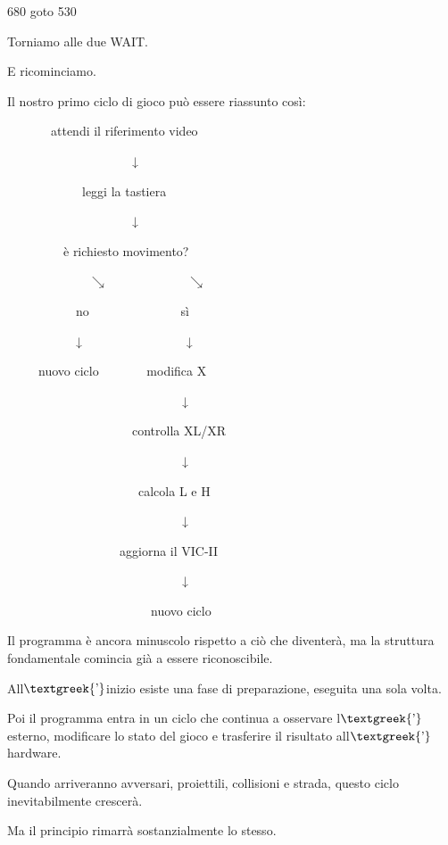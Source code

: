 \documentclass{article}
\begin{document}
680 goto 530

Torniamo alle due WAIT.

E ricominciamo.

Il nostro primo ciclo di gioco può essere riassunto così:

\ \ \ \ \ \ \ attendi il riferimento video

\ \ \ \ \ \ \ \ \ \ \ \ \ \ \ \ \ \ \ \ ↓

\ \ \ \ \ \ \ \ \ \ \ \ leggi la tastiera

\ \ \ \ \ \ \ \ \ \ \ \ \ \ \ \ \ \ \ \ ↓

\ \ \ \ \ \ \ \ \ è richiesto movimento?

\ \ \ \ \ \ \ \ \ \ \ \ \ $\searrow $ \ \ \ \ \ \ \ \ \ \ \ \ $\searrow $

\ \ \ \ \ \ \ \ \ \ \ no \ \ \ \ \ \ \ \ \ \ \ \ \ \ sì

\ \ \ \ \ \ \ \ \ \ \ ↓ \ \ \ \ \ \ \ \ \ \ \ \ \ \ \ \ ↓

\ \ \ \ \ nuovo ciclo \ \ \ \ \ \ \ modifica X

\ \ \ \ \ \ \ \ \ \ \ \ \ \ \ \ \ \ \ \ \ \ \ \ \ \ \ \ ↓

\ \ \ \ \ \ \ \ \ \ \ \ \ \ \ \ \ \ \ \ controlla XL/XR

\ \ \ \ \ \ \ \ \ \ \ \ \ \ \ \ \ \ \ \ \ \ \ \ \ \ \ \ ↓

\ \ \ \ \ \ \ \ \ \ \ \ \ \ \ \ \ \ \ \ \ calcola L e H

\ \ \ \ \ \ \ \ \ \ \ \ \ \ \ \ \ \ \ \ \ \ \ \ \ \ \ \ ↓

\ \ \ \ \ \ \ \ \ \ \ \ \ \ \ \ \ \ aggiorna il VIC-II

\ \ \ \ \ \ \ \ \ \ \ \ \ \ \ \ \ \ \ \ \ \ \ \ \ \ \ \ ↓

\ \ \ \ \ \ \ \ \ \ \ \ \ \ \ \ \ \ \ \ \ \ \ nuovo ciclo

Il programma è ancora minuscolo rispetto a ciò che diventerà, ma la struttura fondamentale comincia già a essere
riconoscibile.

All$\text{\textgreek{’}}$inizio esiste una fase di preparazione, eseguita una sola volta.

Poi il programma entra in un ciclo che continua a osservare l$\text{\textgreek{’}}$esterno, modificare lo stato del
gioco e trasferire il risultato all$\text{\textgreek{’}}$hardware.

Quando arriveranno avversari, proiettili, collisioni e strada, questo ciclo inevitabilmente crescerà.

Ma il principio rimarrà sostanzialmente lo stesso.
\end{document}
